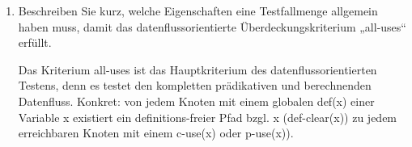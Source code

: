 \documentclass{lehramt-informatik-aufgabe}
\begin{document}
\begin{enumerate}

\item Beschreiben Sie kurz, welche Eigenschaften eine Testfallmenge
allgemein haben muss, damit das datenflussorientierte
Überdeckungskriterium „all-uses“ erfüllt.

\begin{liAntwort}
Das Kriterium all-uses ist das Hauptkriterium des datenﬂussorientierten
Testens, denn es testet den kompletten prädikativen und berechnenden
Datenﬂuss. Konkret: von jedem Knoten mit einem globalen def(x) einer
Variable x existiert ein deﬁnitions-freier Pfad bzgl. x (def-clear(x))
zu jedem erreichbaren Knoten mit einem c-use(x) oder p-use(x)).
\end{liAntwort}

\end{enumerate}
\end{document}
